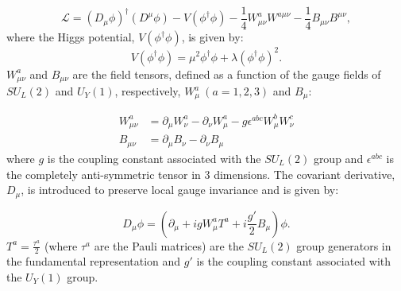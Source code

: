 \begin{equation}
\mathcal{L}=(D_{\mu}\phi)^{\dagger}(D^{\mu}\phi)-V(\phi^{\dagger} \phi)-\frac{1}{4} W_{\mu \nu}^a W^{a \mu \nu}-\frac{1}{4} B_{\mu \nu} B^{\mu \nu},
\label{eq:Lagragian}
\end{equation}
where the Higgs potential, $V(\phi^{\dagger} \phi)$, is given by:
\begin{equation}
V(\phi^{\dagger} \phi) = \mu^2 \phi^{\dagger} \phi + \lambda (\phi^{\dagger} \phi)^2.
\label{eq:higgsV}
\end{equation}
$W^a_{\mu\nu}$ and $B_{\mu\nu}$ are the field tensors, defined as a function of the gauge fields of $SU_L(2)$ and $U_Y(1)$, respectively, $W^a_{\mu}~(a=1,2,3)$ and $B_{\mu}$:

\begin{align}
	W^a_{\mu\nu}&=\partial_{\mu}W^a_{\nu}-\partial_{\nu}W^a_{\mu}-g\epsilon^{abc}W^b_{\mu}W^c_{\nu} \\
	B_{\mu\nu}&=\partial_{\mu}B_{\nu}-\partial_{\nu}B_{\mu}
\end{align}
where $g$ is the coupling constant associated with the $SU_L(2)$ group and $\epsilon^{abc}$ is the completely anti-symmetric tensor in 3 dimensions. The covariant derivative, $D_{\mu}$, is introduced to preserve local gauge invariance and is given by:

\begin{equation}
	D_{\mu}\phi = \left(\partial_{\mu} + igW^a_{\mu}T^a + i\frac{g'}{2}B_{\mu}\right)\phi.
	\label{eq:covariant_derivative}
\end{equation}
$T^a=\frac{\tau^a}{2}$ (where $\tau^a$ are the Pauli matrices) are the $SU_L(2)$ group generators in the fundamental representation and $g'$ is the coupling constant associated with the $U_Y(1)$ group.

